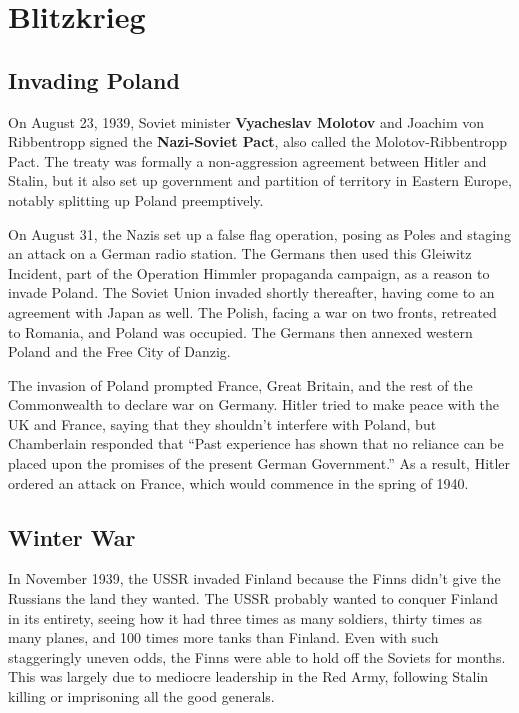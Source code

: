 \section{Blitzkrieg}

\subsection*{Invading Poland}

On August 23, 1939,
Soviet minister \textbf{Vyacheslav Molotov} and Joachim von Ribbentropp signed the
\textbf{Nazi-Soviet Pact}, also called the Molotov-Ribbentropp Pact.
The treaty was formally a non-aggression agreement between Hitler and Stalin,
but it also set up government and partition of territory in Eastern Europe,
notably splitting up Poland preemptively.

On August 31, the Nazis set up a false flag operation,
posing as Poles and staging an attack on a German radio station.
The Germans then used this Gleiwitz Incident, part of the Operation Himmler propaganda campaign,
as a reason to invade Poland.
The Soviet Union invaded shortly thereafter, having come to an agreement with Japan as well.
The Polish, facing a war on two fronts, retreated to Romania, and Poland was occupied.
The Germans then annexed western Poland and the Free City of Danzig.

The invasion of Poland prompted France, Great Britain,
and the rest of the Commonwealth to declare war on Germany.
Hitler tried to make peace with the UK and France, saying that they shouldn't interfere with Poland,
but Chamberlain responded that
``Past experience has shown that no reliance
can be placed upon the promises of the present German Government.''
As a result, Hitler ordered an attack on France, which would commence in the spring of 1940.

\subsection*{Winter War}

In November 1939,
the USSR invaded Finland because the Finns didn't give the Russians the land they wanted.
The USSR probably wanted to conquer Finland in its entirety,
seeing how it had three times as many soldiers, thirty times as many planes,
and 100 times more tanks than Finland.
Even with such staggeringly uneven odds, the Finns were able to hold off the Soviets for months.
This was largely due to mediocre leadership in the Red Army,
following Stalin killing or imprisoning all the good generals.

